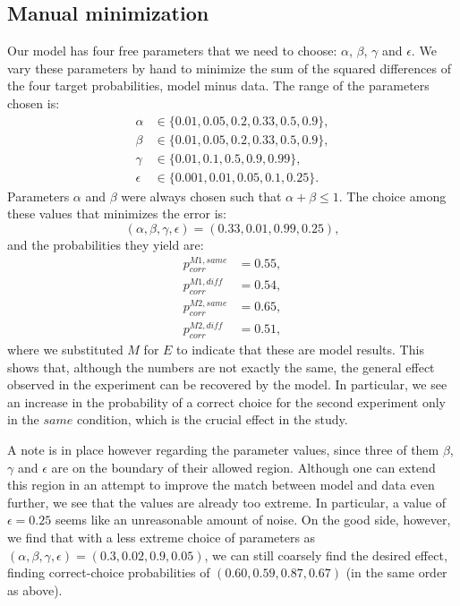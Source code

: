 \documentclass[11pt, a4paper]{article}
\begin{document}
\subsection*{Manual minimization}
Our model has four free parameters that we need to choose: $\alpha$, $\beta$, $\gamma$ and $\epsilon$. We vary these parameters by hand to minimize the sum of the squared differences of the four target probabilities, model minus data. The range of the parameters chosen is:
\begin{equation}
\begin{split}
\alpha&\in\{0.01, 0.05, 0.2, 0.33, 0.5, 0.9\},\\
\beta&\in\{0.01, 0.05, 0.2, 0.33, 0.5, 0.9\},\\
\gamma&\in\{0.01, 0.1, 0.5, 0.9, 0.99\},\\
\epsilon&\in\{0.001, 0.01, 0.05, 0.1, 0.25\}.
\end{split}
\end{equation}
Parameters $\alpha$ and $\beta$ were always chosen such that $\alpha+\beta\leq1$. The choice among these values that minimizes the error is:
\begin{equation}
(\alpha,\beta,\gamma,\epsilon)=(0.33,0.01,0.99,0.25),
\end{equation}
and the probabilities they yield are:
\begin{equation}
\begin{split}
p^{M1,same}_{corr}&=0.55,\\
p^{M1,diff}_{corr}&=0.54,\\
p^{M2,same}_{corr}&=0.65,\\
p^{M2,diff}_{corr}&=0.51,
\end{split}
\end{equation}
where we substituted $M$ for $E$ to indicate that these are model results. This shows that, although the numbers are not exactly the same, the general effect observed in the experiment can be recovered by the model. In particular, we see an increase in the probability of a correct choice for the second experiment only in the $same$ condition, which is the crucial effect in the study. 

A note is in place however regarding the parameter values, since three of them $\beta$, $\gamma$ and $\epsilon$ are on the boundary of their allowed region. Although one can extend this region in an attempt to improve the match between model and data even further, we see that the values are already too extreme. In particular, a value of $\epsilon=0.25$ seems like an unreasonable amount of noise. On the good side, however, 
we find that with a less extreme choice of parameters as $(\alpha,\beta,\gamma,\epsilon)=(0.3,0.02,0.9,0.05)$, we can still coarsely find the desired effect, finding correct-choice probabilities of $(0.60, 0.59, 0.87, 0.67)$ (in the same order as above). 
\end{document}
